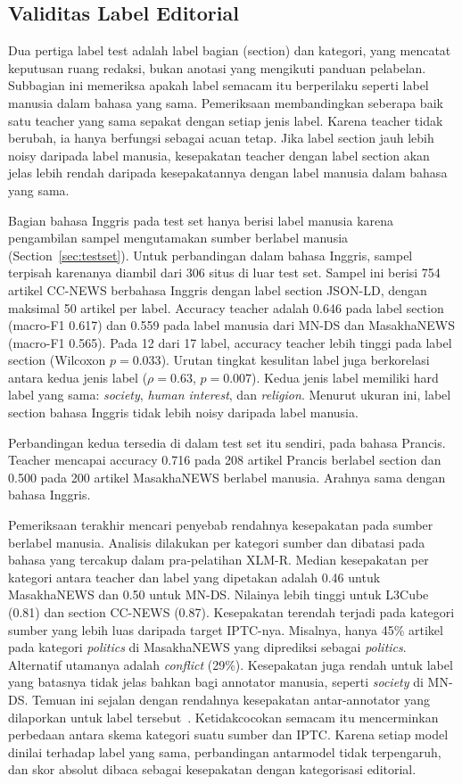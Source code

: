 \documentclass[journal]{IEEEtran}
\begin{document}
\subsection{Validitas Label Editorial}
\label{sec:res-validity}
Dua pertiga label test adalah label bagian (section) dan kategori, yang mencatat keputusan ruang redaksi, bukan anotasi yang mengikuti panduan pelabelan. Subbagian ini memeriksa apakah label semacam itu berperilaku seperti label manusia dalam bahasa yang sama. Pemeriksaan membandingkan seberapa baik satu teacher yang sama sepakat dengan setiap jenis label. Karena teacher tidak berubah, ia hanya berfungsi sebagai acuan tetap. Jika label section jauh lebih noisy daripada label manusia, kesepakatan teacher dengan label section akan jelas lebih rendah daripada kesepakatannya dengan label manusia dalam bahasa yang sama.

Bagian bahasa Inggris pada test set hanya berisi label manusia karena pengambilan sampel mengutamakan sumber berlabel manusia (Section~\ref{sec:testset}). Untuk perbandingan dalam bahasa Inggris, sampel terpisah karenanya diambil dari 306 situs di luar test set. Sampel ini berisi 754 artikel CC-NEWS berbahasa Inggris dengan label section JSON-LD, dengan maksimal 50 artikel per label. Accuracy teacher adalah 0.646 pada label section (macro-F1 0.617) dan 0.559 pada label manusia dari MN-DS dan MasakhaNEWS (macro-F1 0.565). Pada 12 dari 17 label, accuracy teacher lebih tinggi pada label section (Wilcoxon $p=0.033$). Urutan tingkat kesulitan label juga berkorelasi antara kedua jenis label ($\rho=0.63$, $p=0.007$). Kedua jenis label memiliki hard label yang sama: \emph{society}, \emph{human interest}, dan \emph{religion}. Menurut ukuran ini, label section bahasa Inggris tidak lebih noisy daripada label manusia.

Perbandingan kedua tersedia di dalam test set itu sendiri, pada bahasa Prancis. Teacher mencapai accuracy 0.716 pada 208 artikel Prancis berlabel section dan 0.500 pada 200 artikel MasakhaNEWS berlabel manusia. Arahnya sama dengan bahasa Inggris.

Pemeriksaan terakhir mencari penyebab rendahnya kesepakatan pada sumber berlabel manusia. Analisis dilakukan per kategori sumber dan dibatasi pada bahasa yang tercakup dalam pra-pelatihan XLM-R. Median kesepakatan per kategori antara teacher dan label yang dipetakan adalah 0.46 untuk MasakhaNEWS dan 0.50 untuk MN-DS. Nilainya lebih tinggi untuk L3Cube (0.81) dan section CC-NEWS (0.87). Kesepakatan terendah terjadi pada kategori sumber yang lebih luas daripada target IPTC-nya. Misalnya, hanya 45\% artikel pada kategori \emph{politics} di MasakhaNEWS yang diprediksi sebagai \emph{politics}. Alternatif utamanya adalah \emph{conflict} (29\%). Kesepakatan juga rendah untuk label yang batasnya tidak jelas bahkan bagi annotator manusia, seperti \emph{society} di MN-DS. Temuan ini sejalan dengan rendahnya kesepakatan antar-annotator yang dilaporkan untuk label tersebut~\cite{kuzman2025llm}. Ketidakcocokan semacam itu mencerminkan perbedaan antara skema kategori suatu sumber dan IPTC. Karena setiap model dinilai terhadap label yang sama, perbandingan antarmodel tidak terpengaruh, dan skor absolut dibaca sebagai kesepakatan dengan kategorisasi editorial.
\end{document}
